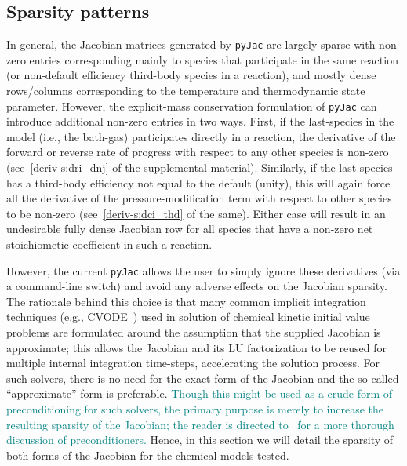 \documentclass[12pt,number,sort&compress,preprint]{elsarticle}
\newcommand{\add}[1]{{\sloppy\textcolor{teal}{#1}}}  %
\begin{document}
\subsection{Sparsity patterns}
\label{S:sparsity}

In general, the Jacobian matrices generated by \texttt{pyJac} are largely sparse with non-zero entries corresponding mainly to species that participate in the same reaction (or non-default efficiency third-body species in a reaction), and mostly dense rows\slash columns corresponding to the temperature and thermodynamic state parameter.
However, the explicit-mass conservation formulation of \texttt{pyJac} can introduce additional non-zero entries in two ways.
First, if the last-species in the model (i.e., the bath-gas) participates directly in a reaction, the derivative of the forward or reverse rate of progress with respect to any other species is non-zero (see~\cref{deriv-s:dri_dnj} of the supplemental material).
Similarly, if the last-species has a third-body efficiency not equal to the default (unity), this will again force all the derivative of the pressure-modification term with respect to other species to be non-zero (see~\cref{deriv-s:dci_thd} of the same).
Either case will result in an undesirable fully dense Jacobian row for all species that have a non-zero net stoichiometic coefficient in such a reaction.

However, the current \texttt{pyJac} allows the user to simply ignore these derivatives (via a command-line switch) and avoid any adverse effects on the Jacobian sparsity.
The rationale behind this choice is that many common implicit integration techniques (e.g., CVODE~\cite{Hindmarsh:2005}) used in solution of chemical kinetic initial value problems are formulated around the assumption that the supplied Jacobian is approximate; this allows the Jacobian and its LU factorization to be reused for multiple internal integration time-steps, accelerating the solution process.
For such solvers, there is no need for the exact form of the Jacobian and the so-called ``approximate'' form is preferable.
\add{Though this might be used as a crude form of preconditioning for such solvers, the primary purpose is merely to increase the resulting sparsity of the Jacobian; the reader is directed to~\cite{MCNENLY2015581} for a more thorough discussion of preconditioners.}
Hence, in this section we will detail the sparsity of both forms of the Jacobian for the chemical models tested.
\end{document}
